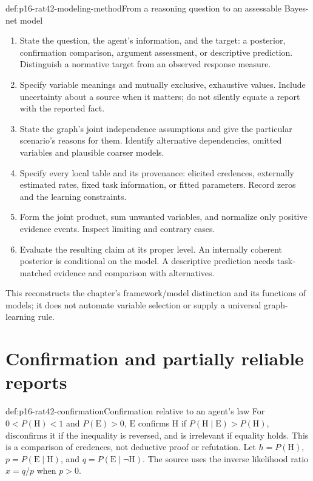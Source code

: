 \begin{hbmethod}{def:p16-rat42-modeling-method}{From a reasoning question to an assessable Bayes-net model}
\begin{enumerate}
\item State the question, the agent's information, and the target:
      a posterior, confirmation comparison, argument assessment, or
      descriptive prediction. Distinguish a normative target from an
      observed response measure.
\item Specify variable meanings and mutually exclusive, exhaustive values.
      Include uncertainty about a source when it matters; do not silently
      equate a report with the reported fact.
\item State the graph's joint independence assumptions and give the
      particular scenario's reasons for them. Identify alternative
      dependencies, omitted variables and plausible coarser models.
\item Specify every local table and its provenance: elicited credences,
      externally estimated rates, fixed task information, or fitted
      parameters. Record zeros and the learning constraints.
\item Form the joint product, sum unwanted variables, and normalize only
      positive evidence events. Inspect limiting and contrary cases.
\item Evaluate the resulting claim at its proper level. An internally
      coherent posterior is conditional on the model. A descriptive
      prediction needs task-matched evidence and comparison with alternatives.
\end{enumerate}
This reconstructs the chapter's framework/model distinction and its
functions of models; it does not automate variable selection or supply
a universal graph-learning rule.
\end{hbmethod}

\section{Confirmation and partially reliable reports}
\label{sec:p16-rat42-reliability-confirmation}

\begin{hbdefinition}{def:p16-rat42-confirmation}{Confirmation relative to an agent's law}
For \(0<P(\mathrm H)<1\) and \(P(\mathrm E)>0\),
\(\mathrm E\) confirms \(\mathrm H\) if
\(P(\mathrm H\mid\mathrm E)>P(\mathrm H)\), disconfirms it if
the inequality is reversed, and is irrelevant if equality holds.
This is a comparison of credences, not deductive proof or refutation.
Let \(h=P(\mathrm H)\), \(p=P(\mathrm E\mid\mathrm H)\),
and \(q=P(\mathrm E\mid\neg\mathrm H)\). The source uses
the inverse likelihood ratio \(x=q/p\) when \(p>0\).
\end{hbdefinition}

